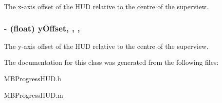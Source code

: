 The x-\/axis offset of the H\+U\+D relative to the centre of the superview. \hypertarget{interface_m_b_progress_h_u_d_ad526ffcabab5131697eb0850c50ab1f4}{
\subsubsection[{y\+Offset}]{\setlength{\rightskip}{0pt plus 5cm}-\/ (float) y\+Offset\hspace{0.3cm}{\ttfamily [read]}, {\ttfamily [write]}, {\ttfamily [atomic]}, {\ttfamily [assign]}}}\label{interface_m_b_progress_h_u_d_ad526ffcabab5131697eb0850c50ab1f4}
The y-\/axis offset of the H\+U\+D relative to the centre of the superview. 

The documentation for this class was generated from the following files\+:\begin{DoxyCompactItemize}
\item 
M\+B\+Progress\+H\+U\+D.\+h\item 
M\+B\+Progress\+H\+U\+D.\+m\end{DoxyCompactItemize}
